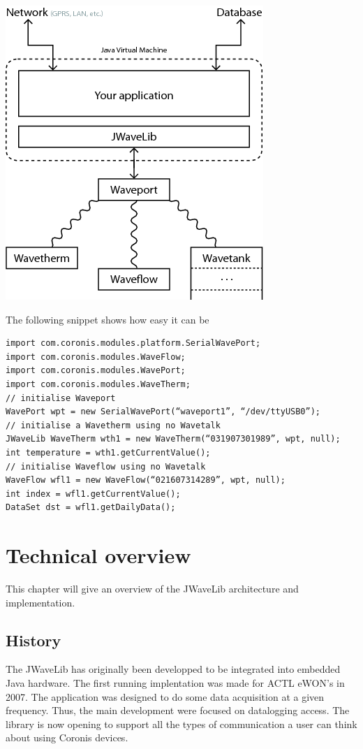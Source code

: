 \documentclass[a4paper,10pt,english]{sphinxmanual}
\begin{document}
{\hfill\includegraphics{schema.png}\hfill}

The following snippet shows how easy it can be

\begin{Verbatim}[commandchars=@\[\]]
import com.coronis.modules.platform.SerialWavePort;
import com.coronis.modules.WaveFlow;
import com.coronis.modules.WavePort;
import com.coronis.modules.WaveTherm;
// initialise Waveport
WavePort wpt = new SerialWavePort(“waveport1”, “/dev/ttyUSB0”);
// initialise a Wavetherm using no Wavetalk
JWaveLib WaveTherm wth1 = new WaveTherm(“031907301989”, wpt, null);
int temperature = wth1.getCurrentValue();
// initialise Waveflow using no Wavetalk
WaveFlow wfl1 = new WaveFlow(“021607314289”, wpt, null);
int index = wfl1.getCurrentValue();
DataSet dst = wfl1.getDailyData();
\end{Verbatim}


\chapter{Technical overview}
\label{technical_overview:technical-overview}\label{technical_overview::doc}
This chapter will give an overview of the JWaveLib architecture and implementation.


\section{History}
\label{technical_overview:history}
The JWaveLib has originally been developped to be integrated into embedded
Java hardware. The first running implentation was made for ACTL eWON's in 2007.
The application was designed to do some data acquisition at a given frequency.
Thus, the main development were focused on datalogging access. The library is
now opening to support all the types of communication a user can think about
using Coronis devices.
\end{document}
